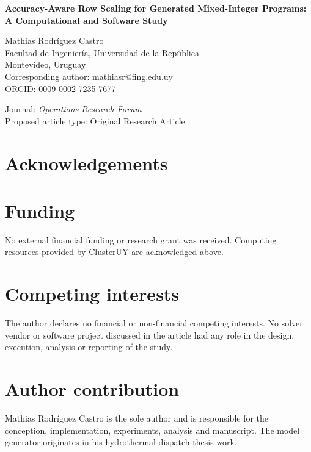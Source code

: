 \documentclass[11pt]{article}
\begin{document}
\begin{center}
{\Large\bfseries Accuracy-Aware Row Scaling for Generated Mixed-Integer Programs:
A Computational and Software Study\par}
\bigskip
Mathias Rodr\'iguez Castro\\
Facultad de Ingenier\'ia, Universidad de la Rep\'ublica\\
Montevideo, Uruguay\\
Corresponding author: \href{mailto:mathiasr@fing.edu.uy}{mathiasr@fing.edu.uy}\\
ORCID: \href{https://orcid.org/0009-0002-7235-7677}{0009-0002-7235-7677}
\end{center}
\bigskip
\noindent Journal: \emph{Operations Research Forum}\\
Proposed article type: Original Research Article

\section*{Acknowledgements}


\section*{Funding}
No external financial funding or research grant was received. Computing resources
provided by ClusterUY are acknowledged above.

\section*{Competing interests}
The author declares no financial or non-financial competing interests. No solver
vendor or software project discussed in the article had any role in the design,
execution, analysis or reporting of the study.

\section*{Author contribution}
Mathias Rodr\'iguez Castro is the sole author and is responsible for the conception,
implementation, experiments, analysis and manuscript. The model generator
originates in his hydrothermal-dispatch thesis work.
\end{document}

